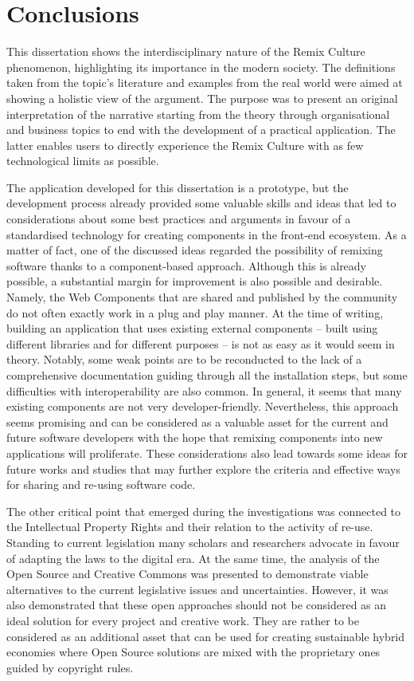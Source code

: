 \chapter*{Conclusions}
\label{ch:conclusions}

This dissertation shows the interdisciplinary nature of the Remix Culture phenomenon, highlighting its importance in the modern society. The definitions taken from the topic’s literature and examples from the real world were aimed at showing a holistic view of the argument. The purpose was to present an original interpretation of the narrative starting from the theory through organisational and business topics to end with the development of a practical application. The latter enables users to directly experience the Remix Culture with as few technological limits as possible.

The application developed for this dissertation is a prototype, but the development process already provided some valuable skills and ideas that led to considerations about some best practices and arguments in favour of a standardised technology for creating components in the front-end ecosystem.
As a matter of fact, one of the discussed ideas regarded the possibility of remixing software thanks to a component-based approach. Although this is already possible, a substantial margin for improvement is also possible and desirable. Namely, the Web Components that are shared and published by the community do not often exactly work in a plug and play manner. At the time of writing, building an application that uses existing external components – built using different libraries and for different purposes – is not as easy as it would seem in theory. Notably, some weak points are to be reconducted to the lack of a comprehensive documentation guiding through all the installation steps, but some difficulties with interoperability are also common. In general, it seems that many existing components are not very developer-friendly.
Nevertheless, this approach seems promising and can be considered as a valuable asset for the current and future software developers with the hope that remixing components into new applications will proliferate. These considerations also lead towards some ideas for future works and studies that may further explore the criteria and effective ways for sharing and re-using software code.

The other critical point that emerged during the investigations was connected to the Intellectual Property Rights and their relation to the activity of re-use. Standing to current legislation many scholars and researchers advocate in favour of adapting the laws to the digital era. At the same time, the analysis of the Open Source and Creative Commons was presented to demonstrate viable alternatives to the current legislative issues and uncertainties. However, it was also demonstrated that these open approaches should not be considered as an ideal solution for every project and creative work. They are rather to be considered as an additional asset that can be used for creating sustainable hybrid economies where Open Source solutions are mixed with the proprietary ones guided by copyright rules.

